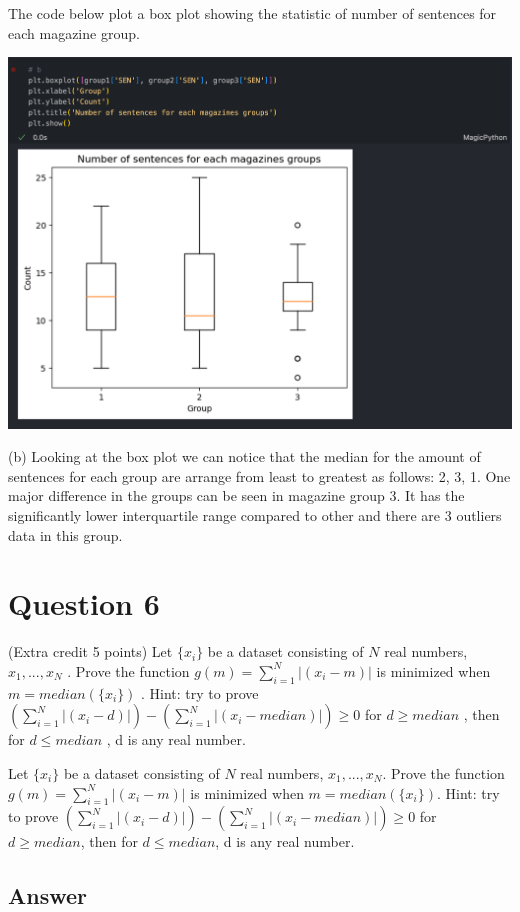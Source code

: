 \documentclass{report}
\begin{document}
    \newpage
    The code below plot a box plot showing the statistic of number of sentences for each magazine group.

    \includegraphics[scale=0.35]{q5b.png}

    (b) Looking at the box plot we can notice that the median for the amount of sentences for each group are arrange from least to greatest as follows: 2, 3, 1.
    One major difference in the groups can be seen in magazine group 3. It has the significantly lower interquartile range compared to other and there are 3 outliers data in this group.

\newpage

\section*{Question 6}

(Extra credit 5 points) Let $\{x_i\}$
 be a dataset consisting of $N$
 real numbers, $x_1,...,x_N$
. Prove the function $g(m)=\sum_{i=1}^{N}|(x_i-m)|$
 is minimized when $m=median(\{x_i\})$
. Hint: try to prove $(\sum_{i=1}^{N}|(x_i-d)|)-(\sum_{i=1}^{N}|(x_i-median)|)\geq0$
 for $d \geq median$
, then for $d \leq median$
, d is any real number.


Let $\{x_i\}$ be a dataset consisting of $N$ real numbers, $x_1,...,x_N$. Prove the function $g(m)=\sum_{i=1}^{N}|(x_i-m)|$ is minimized when $m=median(\{x_i\})$. Hint: try to prove $(\sum_{i=1}^{N}|(x_i-d)|)-(\sum_{i=1}^{N}|(x_i-median)|)\geq0$ for $d \geq median$, then for $d \leq median$, d is any real number.

\subsection*{Answer}
\end{document}
